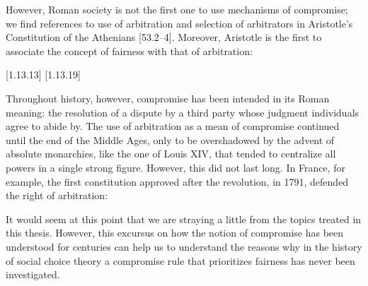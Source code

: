 However, Roman society is not the first one to use mechanisms of compromise; we find references to use of arbitration and selection of arbitrators in Aristotle’s Constitution of the Athenians [53.2–4]. %
Moreover, Aristotle is the first to associate the concept of fairness with that of arbitration:
%
\begin{displayquote}
\textit{}\citet{OnRhetoric}[1.13.13]
\textit{}\citet{OnRhetoric}[1.13.19]
\end{displayquote}
%
Throughout history, however, compromise has been intended in its Roman meaning: the resolution of a dispute by a third party whose judgment individuals agree to abide by.
The use of arbitration as a mean of compromise continued until the end of the Middle Ages, only to be overshadowed by the advent of absolute monarchies, like the one of Louis XIV, that tended to centralize all powers in a single strong figure.\citep{Zappala2018}
However, this did not last long. In France, for example, the first constitution approved after the revolution, in 1791, defended the right of arbitration:
%
\begin{displayquote}
\textit{}\citep{Constitution1791}
\end{displayquote}
%
It would seem at this point that we are straying a little from the topics treated in this thesis. However, this excursus on how the notion of compromise has been understood for centuries can help us to understand the reasons why in the history of social choice theory a compromise rule that prioritizes fairness has never been investigated.

